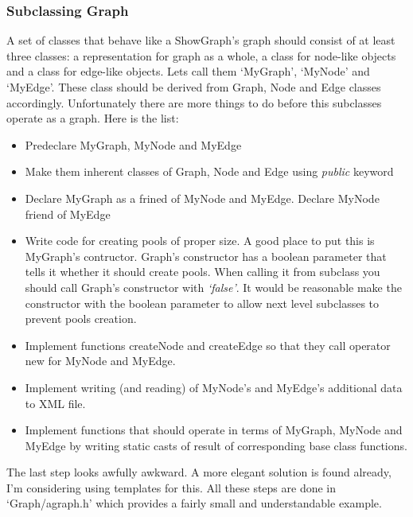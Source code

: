 \documentclass[11pt,twoside,a4paper]{article}
\begin{document}
\subsubsection{Subclassing Graph}
A set of classes that behave like a ShowGraph's graph should consist of at least three classes: a representation for graph as a whole, a class for node-like objects and a class for edge-like objects. Lets call them `MyGraph', `MyNode' and `MyEdge'. These class should be derived from Graph, Node and Edge classes accordingly. Unfortunately there are more things to do before this subclasses operate as a graph. Here is the list:
\begin{itemize}
\item Predeclare MyGraph, MyNode and MyEdge
\item Make them inherent classes of Graph, Node and Edge using \emph{public} keyword
\item Declare MyGraph as a frined of MyNode and MyEdge. Declare MyNode friend of MyEdge
\item Write code for creating pools of proper size. A good place to put this is MyGraph's contructor. Graph's constructor has a boolean parameter that tells it whether it should create pools. When calling it from subclass you should call Graph's constructor with \emph{`false'}. It would be reasonable make the constructor with the boolean parameter to allow next level subclasses to prevent pools creation.
\item Implement functions createNode and createEdge so that they call operator new for MyNode and MyEdge.
\item Implement writing (and reading) of MyNode's and MyEdge's additional data to XML file.
\item Implement functions that should operate in terms of MyGraph, MyNode and MyEdge by writing static casts of result of corresponding base class functions.
\end{itemize}

The last step looks awfully awkward. A more elegant solution is found already, I'm considering using templates for this. All these steps are done in `Graph/agraph.h' which provides a fairly small and understandable  example.
\end{document}
